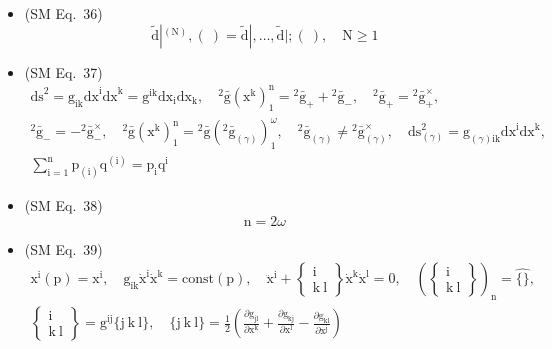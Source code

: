 \documentclass[12pt]{article}
\begin{document}
\begin{itemize}[label={},leftmargin=0pt]
    \item (SM Eq.\ 36) 
    \[
    \tilde{\mathrm{d}}|^{(\mathrm{N})}, (\ ) = \tilde{\mathrm{d}}|, \dots, \tilde{\mathrm{d}}|; (\ ), \quad \mathrm{N} \ge 1
    \]

    \item (SM Eq.\ 37) 
    \[
    \begin{gathered} 
    \mathrm{ds}^2 = \mathrm{g}_{\mathrm{ik}} \mathrm{dx}^\mathrm{i} \mathrm{dx}^\mathrm{k} = \mathrm{g}^{\mathrm{ik}} \mathrm{dx}_\mathrm{i} \mathrm{dx}_\mathrm{k}, \quad {}^2\bar{\mathrm{g}}(\mathrm{x^k})_1^\mathrm{n} = {}^2\bar{\mathrm{g}}_+ + {}^2\bar{\mathrm{g}}_-, \quad {}^2\bar{\mathrm{g}}_+ = {}^2\bar{\mathrm{g}}_+^\times, \\ 
    {}^2\bar{\mathrm{g}}_- = -{}^2\bar{\mathrm{g}}_-^\times, \quad {}^2\bar{\mathrm{g}}(\mathrm{x^k})_1^\mathrm{n} = {}^2\bar{\mathrm{g}}({}^2\bar{\mathrm{g}}_{(\gamma)})_1^\omega, \quad {}^2\bar{\mathrm{g}}_{(\gamma)} \ne {}^2\bar{\mathrm{g}}_{(\gamma)}^\times, \quad \mathrm{ds}_{(\gamma)}^2 = \mathrm{g}_{(\gamma)\mathrm{ik}} \mathrm{dx}^\mathrm{i} \mathrm{dx}^\mathrm{k}, \\ 
    \sum_{\mathrm{i}=1}^\mathrm{n} \mathrm{p}_{(\mathrm{i})} \mathrm{q}^{(\mathrm{i})} = \mathrm{p_i} \mathrm{q^i} 
    \end{gathered}
    \]

    \item (SM Eq.\ 38) 
    \[
    \mathrm{n} = 2\omega
    \]

    \item (SM Eq.\ 39) 
    \[
    \begin{gathered}
    \mathrm{x^i}(\mathrm{p}) = \mathrm{x^i}, \quad \mathrm{g}_{\mathrm{ik}} \dot{\mathrm{x}}^\mathrm{i} \dot{\mathrm{x}}^\mathrm{k} = \mathrm{const}(\mathrm{p}), \quad \ddot{\mathrm{x}}^\mathrm{i} + \left\{ \begin{smallmatrix} \mathrm{i} \\ \mathrm{k\ l} \end{smallmatrix} \right\} \dot{\mathrm{x}}^\mathrm{k} \dot{\mathrm{x}}^\mathrm{l} = 0, \quad \left( \left\{ \begin{smallmatrix} \mathrm{i} \\ \mathrm{k\ l} \end{smallmatrix} \right\} \right)_\mathrm{n} = \widehat{\{\}}, \\
    \left\{ \begin{smallmatrix} \mathrm{i} \\ \mathrm{k\ l} \end{smallmatrix} \right\} = \mathrm{g}^{\mathrm{ij}} \{ \mathrm{j\ k\ l} \}, \quad \{ \mathrm{j\ k\ l} \} = \frac{1}{2}\left( \frac{\partial \mathrm{g}_{\mathrm{jl}}}{\partial \mathrm{x^k}} + \frac{\partial \mathrm{g}_{\mathrm{kj}}}{\partial \mathrm{x^l}} - \frac{\partial \mathrm{g}_{\mathrm{kl}}}{\partial \mathrm{x^j}} \right)
    \end{gathered}
    \]


\end{itemize}
\end{document}
